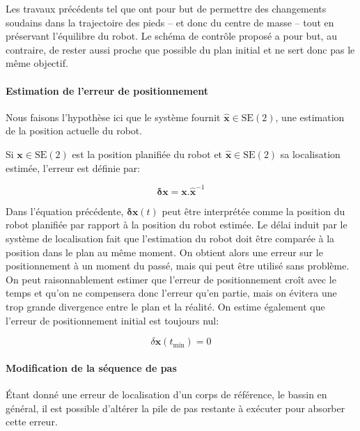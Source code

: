 Les travaux précédents tel que \cite{04harada.humanoids,
  07morisawa.icra} ont pour but de permettre des changements soudains
dans la trajectoire des pieds -- et donc du centre de masse -- tout en
préservant l'équilibre du robot. Le schéma de contrôle proposé a pour
but, au contraire, de rester aussi proche que possible du plan initial
et ne sert donc pas le même objectif.


\paragraph{Estimation de l'erreur de positionnement}

Nous faisons l'hypothèse ici que le système fournit
\mbox{$\hat{\mathbf{x}} \in \text{SE}(2)$}, une estimation de la
position actuelle du robot.

Si $\mathbf{x} \in \text{SE}(2)$ est la position planifiée du robot et
$\hat{\mathbf{x}} \in \text{SE}(2)$ sa localisation estimée, l'erreur
est définie par:

\begin{equation}\label{eq:errorpos}
  \mathbf{\delta x} = \mathbf{x} . \hat{\mathbf{x}}^{-1}
\end{equation}

Dans l'équation précédente, $\mathbf{\delta x}(t)$ peut être
interprétée comme la position du robot planifiée par rapport à la
position du robot estimée. Le délai induit par le système de
localisation fait que l'estimation du robot doit être comparée à la
position dans le plan au même moment. On obtient alors une erreur sur
le positionnement à un moment du passé, mais qui peut être utilisé
sans problème. On peut raisonnablement estimer que l'erreur de
positionnement croît avec le temps et qu'on ne compensera donc
l'erreur qu'en partie, mais on évitera une trop grande divergence
entre le plan et la réalité. On estime également que l'erreur de
positionnement initial est toujours nul:

\begin{equation}\label{eq:errorpos_prop}
\delta \mathbf{x}(t_{\text{min}}) = 0
\end{equation}

\paragraph{Modification de la séquence de pas}

Étant donné une erreur de localisation d'un corps de référence, le
bassin en général, il est possible d'altérer la pile de pas restante à
exécuter pour absorber cette erreur.

